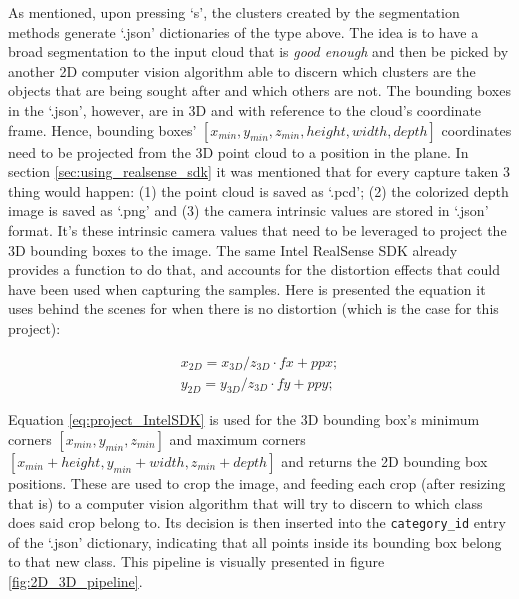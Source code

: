 \documentclass[../main.tex]{subfiles}
\begin{document}
As mentioned, upon pressing `s', the clusters created by the segmentation methods generate `.json' dictionaries of the type above. The idea is to have a broad segmentation to the input cloud that is \emph{good enough} and then be picked by another 2D computer vision algorithm able to discern which clusters are the objects that are being sought after and which others are not. The bounding boxes in the `.json', however, are in 3D and with reference to the cloud's coordinate frame. Hence, bounding boxes' $[x_{min}, y_{min}, z_{min}, height, width, depth]$  coordinates need to be projected from the 3D point cloud to a position in the plane. In section \ref{sec:using_realsense_sdk} it was mentioned that for every capture taken 3 thing would happen: (1) the point cloud is saved as `.pcd'; (2) the colorized depth image is saved as `.png' and (3) the camera intrinsic values are stored in `.json' format.  It's these intrinsic camera values that need to be leveraged to project the 3D bounding boxes to the image. The same Intel RealSense SDK already provides a function to do that, and accounts for the distortion effects that could have been used when capturing the samples. Here is presented the equation it uses behind the scenes for when there is no distortion (which is the case for this project):

\begin{align} \label{eq:project_IntelSDK}
    x_{2D} = x_{3D} / z_{3D} \cdot fx + ppx;\\ \nonumber
    y_{2D} = y_{3D} / z_{3D} \cdot fy + ppy; \nonumber 
\end{align}

Equation \ref{eq:project_IntelSDK} is used for the 3D bounding box's minimum corners $[x_{min}, y_{min}, z_{min}]$ and maximum corners $[x_{min} + height, y_{min} + width, z_{min} + depth]$ and returns the 2D bounding box positions. These are used to crop the image, and feeding each crop (after resizing that is) to a computer vision algorithm that will try to discern to which class does said crop belong to. Its decision is then inserted into the \texttt{category\_id} entry of the `.json' dictionary, indicating that all points inside its bounding box belong to that new class. This pipeline is visually presented in figure \ref{fig:2D_3D_pipeline}.
\end{document}
